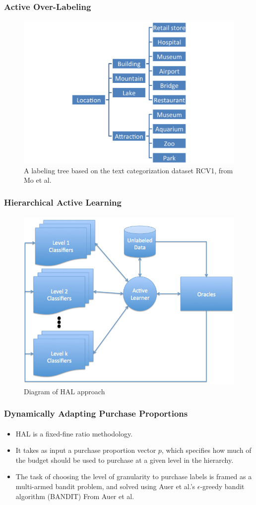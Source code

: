 \documentclass{beamer}
\begin{document}
\begin{frame}
    \frametitle{Active Over-Labeling}
    \framesubtitle{}
    \begin{figure}[!htb]
        \centering
        \includegraphics[width=0.85\columnwidth]{fig/exp-ontology}
        \caption{A labeling tree based on the text categorization dataset RCV1, from Mo et al.}
        \label{fig:exp-ontology}
    \end{figure}
\end{frame}
\begin{frame}
    \frametitle{Hierarchical Active Learning}
    \framesubtitle{}
    \begin{figure}[!htb]
        \centering
        \includegraphics[width=0.65\columnwidth]{fig/AL2}
        \caption{Diagram of HAL approach}
        \label{fig:HALapproach}
    \end{figure}
\end{frame}
\begin{frame}
    \frametitle{Dynamically Adapting Purchase Proportions}
    \framesubtitle{}
    \begin{itemize}
      \item HAL is a fixed-fine ratio methodology.
      \item It takes as input a purchase proportion
vector $p$, which specifies how much of the budget should be used to purchase at
a given level in the hierarchy.
      \item The task of choosing the
level of granularity to purchase labels is framed as a multi-armed bandit problem,
and solved using Auer et al.'s $\epsilon$-greedy bandit algorithm (BANDIT) From Auer et al.
    \end{itemize}
\end{frame}
\end{document}
